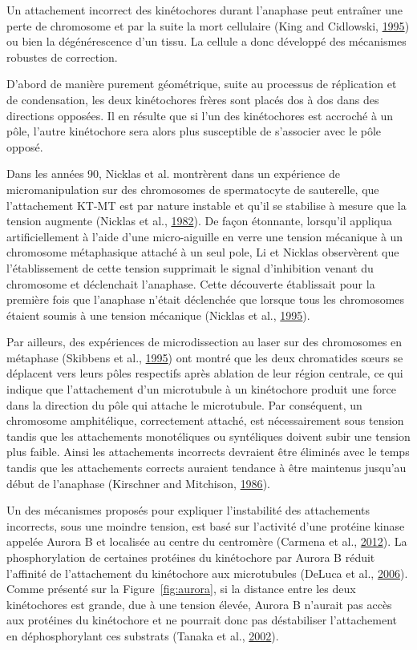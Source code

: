 \documentclass[12pt,a4paper,twoside,openright]{book}
\begin{document}
Un attachement incorrect des kinétochores durant l'anaphase peut
entraîner une perte de chromosome et par la suite la mort cellulaire
(King and Cidlowski, \protect\hyperlink{ref-King1995}{1995}) ou bien la
dégénérescence d'un tissu. La cellule a donc développé des mécanismes
robustes de correction.

D'abord de manière purement géométrique, suite au processus de
réplication et de condensation, les deux kinétochores frères sont placés
dos à dos dans des directions opposées. Il en résulte que si l'un des
kinétochores est accroché à un pôle, l'autre kinétochore sera alors plus
susceptible de s'associer avec le pôle opposé.

Dans les années 90, Nicklas et al. montrèrent dans un expérience de
micromanipulation sur des chromosomes de spermatocyte de sauterelle, que
l'attachement KT-MT est par nature instable et qu'il se stabilise à
mesure que la tension augmente (Nicklas et al.,
\protect\hyperlink{ref-Nicklas1982}{1982}). De façon étonnante,
lorsqu'il appliqua artificiellement à l'aide d'une micro-aiguille en
verre une tension mécanique à un chromosome métaphasique attaché à un
seul pole, Li et Nicklas observèrent que l'établissement de cette
tension supprimait le signal d'inhibition venant du chromosome et
déclenchait l'anaphase. Cette découverte établissait pour la première
fois que l'anaphase n'était déclenchée que lorsque tous les chromosomes
étaient soumis à une tension mécanique (Nicklas et al.,
\protect\hyperlink{ref-Nicklas1995}{1995}).

Par ailleurs, des expériences de microdissection au laser sur des
chromosomes en métaphase (Skibbens et al.,
\protect\hyperlink{ref-Skibbens1995}{1995}) ont montré que les deux
chromatides sœurs se déplacent vers leurs pôles respectifs après
ablation de leur région centrale, ce qui indique que l'attachement d'un
microtubule à un kinétochore produit une force dans la direction du pôle
qui attache le microtubule. Par conséquent, un chromosome amphitélique,
correctement attaché, est nécessairement sous tension tandis que les
attachements monotéliques ou syntéliques doivent subir une tension plus
faible. Ainsi les attachements incorrects devraient être éliminés avec
le temps tandis que les attachements corrects auraient tendance à être
maintenus jusqu'au début de l'anaphase (Kirschner and Mitchison,
\protect\hyperlink{ref-Kirschner1986}{1986}).

Un des mécanismes proposés pour expliquer l'instabilité des attachements
incorrects, sous une moindre tension, est basé sur l'activité d'une
protéine kinase appelée Aurora B et localisée au centre du centromère
(Carmena et al., \protect\hyperlink{ref-Carmena2012a}{2012}). La
phosphorylation de certaines protéines du kinétochore par Aurora B
réduit l'affinité de l'attachement du kinétochore aux microtubules
(DeLuca et al., \protect\hyperlink{ref-DeLuca2006}{2006}). Comme
présenté sur la Figure~\ref{fig:aurora}, si la distance entre les deux
kinétochores est grande, due à une tension élevée, Aurora B n'aurait pas
accès aux protéines du kinétochore et ne pourrait donc pas déstabiliser
l'attachement en déphosphorylant ces substrats (Tanaka et al.,
\protect\hyperlink{ref-Tanaka2002}{2002}).
\end{document}

